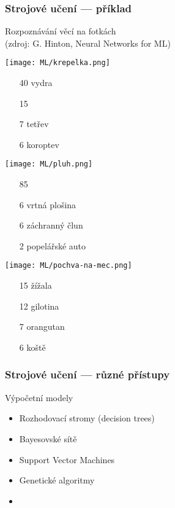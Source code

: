 \documentclass[red,professionalfont]{beamer}
\theoremstyle{definition}
\newcommand{\0}{\mbox{${\bf 0}$}}
\begin{document}
\begin{frame}\frametitle{Strojové učení --- příklad}
\begin{center}
 Rozpoznávání věcí na fotkách\\
 {\tiny(zdroj: G. Hinton, Neural Networks for ML)}
\end{center}\pause
\begin{center}
\begin{minipage}{3cm}
\texttt{[image: ML/krepelka.png]}
\begin{itemize}
\item[40] vydra
\item[15] 
\item[7] tetřev
\item[6] koroptev
\end{itemize}\pause
\end{minipage}\pause
\begin{minipage}{3.5cm}
\texttt{[image: ML/pluh.png]}
\begin{itemize}
\item[85] 
\item[6] vrtná plošina
\item[6] záchranný člun
\item[2] popelářské auto
\end{itemize}\pause
\end{minipage}\pause
\begin{minipage}{3.5cm}
\texttt{[image: ML/pochva-na-mec.png]}
\begin{itemize}
\item[15] žížala
\item[12] gilotina
\item[7] orangutan
\item[6] koště
\end{itemize}
\end{minipage}
\end{center}
\end{frame}



\begin{frame}\frametitle{Strojové učení --- různé přístupy}
\begin{center}
 Výpočetní modely
\end{center}\pause

\begin{itemize}
 \item Rozhodovací stromy (decision trees)\pause
 \item Bayesovské sítě\pause
 \item Support Vector Machines\pause
 \item Genetické algoritmy\pause
 \item {}
\end{itemize}
\end{frame}
\end{document}
